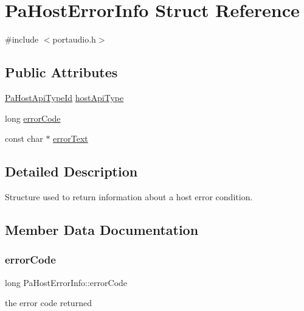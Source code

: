 \hypertarget{struct_pa_host_error_info}{}\section{Pa\+Host\+Error\+Info Struct Reference}
\label{struct_pa_host_error_info}


{\ttfamily \#include $<$portaudio.\+h$>$}

\subsection*{Public Attributes}
\begin{DoxyCompactItemize}
\item 
\hyperlink{portaudio_8h_a8eaebe3d39c5ea45598da8f86dc2e5ae}{Pa\+Host\+Api\+Type\+Id} \hyperlink{struct_pa_host_error_info_aeadfc0e22fee75e94541876d6d7a91f7}{host\+Api\+Type}
\item 
long \hyperlink{struct_pa_host_error_info_a2ab15f358cd7f0a5e8f3d54e161a2fec}{error\+Code}
\item 
const char $\ast$ \hyperlink{struct_pa_host_error_info_aa40a7ed0c73b85b39563d80f7877876c}{error\+Text}
\end{DoxyCompactItemize}


\subsection{Detailed Description}
Structure used to return information about a host error condition. 

\subsection{Member Data Documentation}
\mbox{\label{struct_pa_host_error_info_a2ab15f358cd7f0a5e8f3d54e161a2fec}} 
\subsubsection{\texorpdfstring{error\+Code}{errorCode}}
{\footnotesize\ttfamily long Pa\+Host\+Error\+Info\+::error\+Code}

the error code returned \mbox{\label{struct_pa_host_error_info_aa40a7ed0c73b85b39563d80f7877876c}} 
